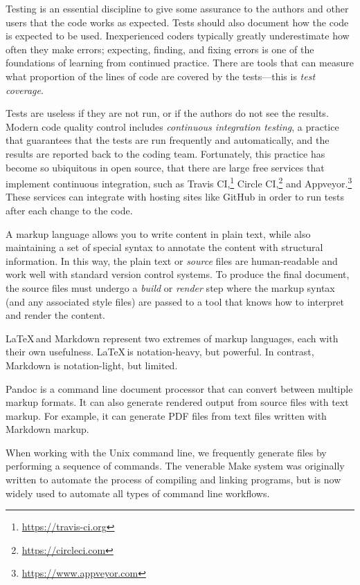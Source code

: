 Testing is an essential discipline to give some assurance to the authors and
other users that the code works as expected.
Tests should also document how the code is expected to be used.
Inexperienced coders typically greatly underestimate how often they make
errors; expecting, finding, and fixing errors is one of the foundations of
learning from continued practice.  There are tools that can measure what
proportion of the lines of code are covered by the tests---this is \emph{test
coverage}.

Tests are useless if they are not run, or if the authors do not see the
results.  Modern code quality control includes \emph{continuous integration
testing}, a practice that guarantees that the tests are run frequently and
automatically, and the results are reported back to the coding team.
Fortunately, this practice has become so ubiquitous in open source, that there
are large free services that implement continuous integration, such as Travis
CI,\footnote{\url{https://travis-ci.org}\label{travis-ci}} Circle
CI,\footnote{\url{https://circleci.com}} and
Appveyor.\footnote{\url{https://www.appveyor.com}}  These services can
integrate with hosting sites like GitHub in order to run tests after each
change to the code.

A markup language allows you to write content in plain text, while also
maintaining a set of special syntax to annotate the content with structural
information.
In this way, the plain text or \emph{source} files are human-readable and work
well with standard version control systems.
To produce the final document, the source files must undergo a \emph{build} or
\emph{render}
step where the markup syntax (and any associated style files) are passed to a
tool that knows how to interpret and render the content.

\LaTeX\,and Markdown represent two extremes of markup languages, each
with their own usefulness.
\LaTeX\,is notation-heavy, but powerful.
In contrast, Markdown is notation-light, but limited.

Pandoc is a command line document processor that can convert between multiple
markup formats.  It can also generate rendered output from source files with
text markup.  For example, it can generate PDF files from text files written
with Markdown markup.

When working with the Unix command line, we frequently generate files
by performing a sequence of commands.
The venerable Make system was originally written to automate the process
of compiling and linking programs, but is now widely used to
automate all types of command line workflows.

